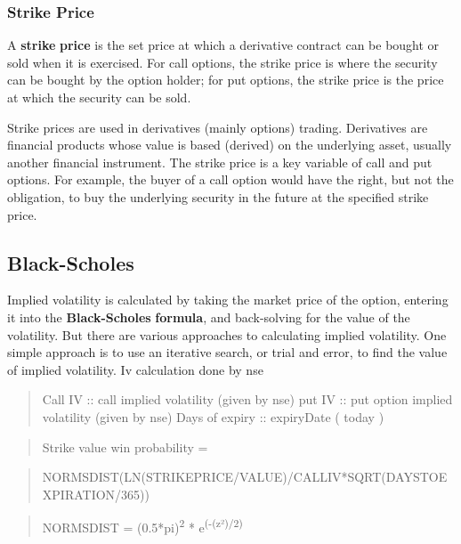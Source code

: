 \begin{multicols}{2}
\hypertarget{strike-price}{%
\subsubsection{Strike Price}\label{strike-price}}

A \textbf{strike} \textbf{price} is the set price at which a derivative
contract can be bought or sold when it is exercised. For call options,
the strike price is where the security can be bought by the option
holder; for put options, the strike price is the price at which the
security can be sold.

Strike prices are used in derivatives (mainly options) trading.
Derivatives are financial products whose value is based (derived) on the
underlying asset, usually another financial instrument. The strike price
is a key variable of call and put options. For example, the buyer of a
call option would have the right, but not the obligation, to buy the
underlying security in the future at the specified strike price.

\end{multicols}

\hypertarget{black-scholes}{%
\subsection{Black-Scholes}\label{black-scholes}}

Implied volatility is calculated by taking the market price of the
option, entering it into the \textbf{Black-Scholes} \textbf{formula},
and back-solving for the value of the volatility. But there are various
approaches to calculating implied volatility. One simple approach is to
use an iterative search, or trial and error, to find the value of
implied volatility. Iv calculation done by nse

\begin{quote}
Call IV :: call implied volatility (given by nse) put IV :: put option
implied volatility (given by nse) Days of expiry :: expiryDate ( today )
\end{quote}

\begin{quote}
Strike value win probability =
\end{quote}

\begin{quote}
NORMSDIST(LN(STRIKEPRICE/VALUE)/CALLIV*SQRT(DAYSTOEXPIRATION/365))
\end{quote}

\begin{quote}
NORMSDIST = (0.5*pi)\textsuperscript{2} * e\textsuperscript{(-(z²)/2)}
\end{quote}

